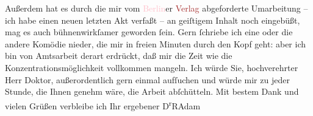                     Außerdem hat es durch die mir vom \textcolor{pink}{Berlin}{}\ledrightnote{\textcolor{pink}{Berlin}}er \textcolor{brown}{Verlag}{} abgeforderte
                    Umarbeitung – ich habe einen neuen letzten Akt verfaßt – an geiſtigem Inhalt
                    noch eingebüßt, mag es auch bühnenwirkſamer geworden ſein.\pend
           \pstart
           Gern ſchriebe ich eine oder die andere Komödie {\pb}nieder, die mir in freien Minuten
                    durch den Kopf geht: aber ich bin von Amtsarbeit derart erdrückt, daß mir die
                    Zeit wie die Konzentrationsmöglichkeit vollkommen mangeln.\pend
           \pstart
           Ich würde Sie, hochverehrter Herr Doktor, außerordentlich gern einmal aufſuchen
                    und würde mir zu jeder Stunde, die Ihnen genehm wäre, die Arbeit
                    abſchütteln.\pend
           \pstart
           Mit bestem Dank und vielen Grüßen verbleibe ich Ihr ergebener\pend
           \pstart \spacefill\mbox{D\textsuperscript{r}RAdam}\pend{}\endnumbering{}  
      